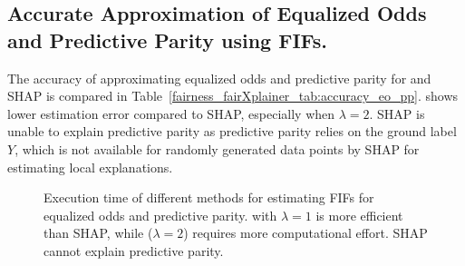 \subsection{Accurate Approximation of Equalized Odds and Predictive Parity using FIFs.}
The accuracy of approximating equalized odds and predictive parity for {\fairXplainer} and SHAP is compared in Table~\ref{fairness_fairXplainer_tab:accuracy_eo_pp}. {\fairXplainer} shows lower estimation error compared to SHAP, especially when $\lambda=2$. SHAP is unable to explain predictive parity as predictive parity relies on the ground label $Y$, which is not available for randomly generated data points by SHAP for estimating local explanations.




\begin{figure}
	\centering
	\caption[Execution time of FIFs]{Execution time of different methods for estimating FIFs for equalized odds and predictive parity. {\fairXplainer} with $ \lambda = 1 $ is more efficient than SHAP, while {\fairXplainer} ($ \lambda = 2 $) requires more computational effort. SHAP cannot explain predictive parity. 
	}
	\label{fairness_fairXplainer_fig:execution_time_cactus_plot_eo_pp}
\end{figure}


